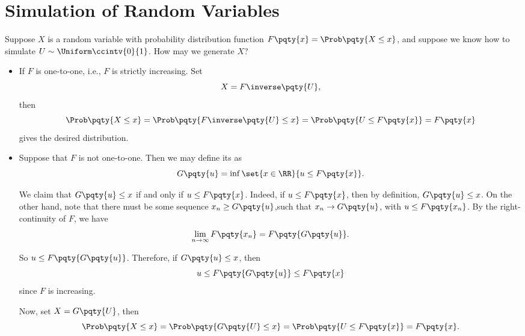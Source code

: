 \section{Simulation of Random Variables}

\begin{example}
    \label{ex:simulation-from-uniform}%
    Suppose \(X\) is a random variable with probability distribution function \(F\pqty{x} = \Prob\pqty{X \leq x}\), and suppose we know how to simulate \(U \sim \Uniform \ccintv{0}{1}\). How may we generate \(X\)?

    \begin{itemize}
        \item If \(F\) is one-to-one, i.e., \(F\) is strictly increasing. Set
        \[
            X = F\inverse\pqty{U},
        \]
        then
        \[
            \Prob\pqty{X \leq x} = \Prob\pqty{F\inverse\pqty{U} \leq x} = \Prob\pqty{U \leq F\pqty{x}} = F\pqty{x}
        \]
        gives the desired distribution.

        \item Suppose that \(F\) is not one-to-one. Then we may define its  as
        \[
            G\pqty{u} = \inf \set{x \in \RR}{u \leq F\pqty{x}}.
        \]

        We claim that \(G\pqty{u} \leq x\) if and only if \(u \leq F\pqty{x}\). Indeed, if \(u \leq F\pqty{x}\), then by definition, \(G\pqty{u} \leq x\). On the other hand, note that there must be some sequence \(x_n \geq G\pqty{u}\),such that \(x_n \to G\pqty{u}\), with \(u \leq F\pqty{x_n}\). By the right-continuity of \(F\), we have
        \[
            \lim_{n \to \infty} F\pqty{x_n} = F\pqty{G\pqty{u}}.
        \]

        So \(u \leq F\pqty{G\pqty{u}}\). Therefore, if \(G\pqty{u} \leq x\), then
        \[
            u \leq F\pqty{G\pqty{u}} \leq F\pqty{x}
        \]
        since \(F\) is increasing.

        Now, set \(X = G\pqty{U}\), then
        \[
            \Prob\pqty{X \leq x} = \Prob\pqty{G\pqty{U} \leq x} = \Prob\pqty{U \leq F\pqty{x}} = F\pqty{x}.
        \]
    \end{itemize} 
\end{example}


